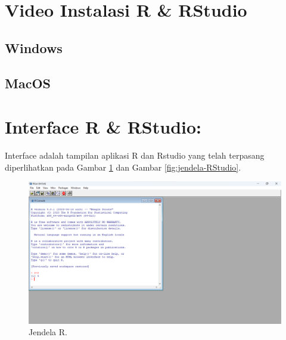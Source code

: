 \documentclass[
]{book}
\begin{document}
\hypertarget{video-instalasi-r-rstudio}{%
\section{Video Instalasi R \& RStudio}\label{video-instalasi-r-rstudio}}

\hypertarget{windows-1}{%
\subsection{Windows}\label{windows-1}}

\hypertarget{macos-1}{%
\subsection{MacOS}\label{macos-1}}

\hypertarget{interface-r-rstudio}{%
\section{Interface R \& RStudio:}\label{interface-r-rstudio}}

Interface adalah tampilan aplikasi R dan Rstudio yang telah terpasang diperlihatkan pada Gambar \ref{fig:jendela-R} dan Gambar \ref{fig:jendela-RStudio}.

\begin{figure}

{\centering \includegraphics[width=1\linewidth]{./images/Bab1/jendela_r} 

}

\caption{Jendela R.}\label{fig:jendela-R}
\end{figure}
\end{document}
